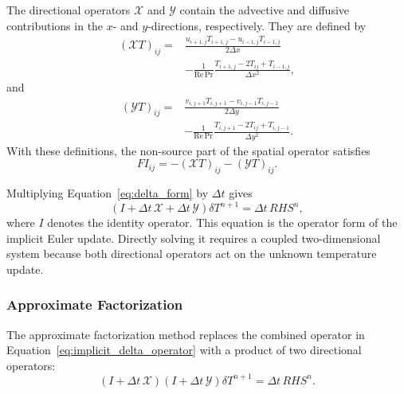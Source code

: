 The directional operators $\mathcal{X}$ and $\mathcal{Y}$
contain the advective and diffusive contributions in the
$x$- and $y$-directions, respectively. They are defined by
\begin{equation}
\begin{aligned}
\left(\mathcal{X}T\right)_{ij}
={}&
\frac{
u_{i+1,j}T_{i+1,j}
-u_{i-1,j}T_{i-1,j}
}{2\Delta x}
\\
&-
\frac{1}{\mathrm{Re}\,\mathrm{Pr}}
\frac{
T_{i+1,j}-2T_{ij}+T_{i-1,j}
}{\Delta x^2},
\end{aligned}
\label{eq:x_operator}
\end{equation}
and
\begin{equation}
\begin{aligned}
\left(\mathcal{Y}T\right)_{ij}
={}&
\frac{
v_{i,j+1}T_{i,j+1}
-v_{i,j-1}T_{i,j-1}
}{2\Delta y}
\\
&-
\frac{1}{\mathrm{Re}\,\mathrm{Pr}}
\frac{
T_{i,j+1}-2T_{ij}+T_{i,j-1}
}{\Delta y^2}.
\end{aligned}
\label{eq:y_operator}
\end{equation}
With these definitions, the non-source part of the spatial
operator satisfies
\begin{equation}
FI_{ij}
=
-\left(\mathcal{X}T\right)_{ij}
-\left(\mathcal{Y}T\right)_{ij}.
\label{eq:fi_operator_relation}
\end{equation}

Multiplying Equation~\eqref{eq:delta_form} by $\Delta t$
gives
\begin{equation}
\left(
I+\Delta t\,\mathcal{X}
+\Delta t\,\mathcal{Y}
\right)\delta T^{n+1}
=
\Delta t\,RHS^n,
\label{eq:implicit_delta_operator}
\end{equation}
where $I$ denotes the identity operator. This equation is
the operator form of the implicit Euler update. Directly
solving it requires a coupled two-dimensional system because
both directional operators act on the unknown temperature
update.

\subsubsection{Approximate Factorization}

The approximate factorization method replaces the combined
operator in Equation~\eqref{eq:implicit_delta_operator}
with a product of two directional operators:
\begin{equation}
\boxed{
\left(I+\Delta t\,\mathcal{X}\right)
\left(I+\Delta t\,\mathcal{Y}\right)
\delta T^{n+1}
=
\Delta t\,RHS^n.
}
\label{eq:approximate_factorization}
\end{equation}

